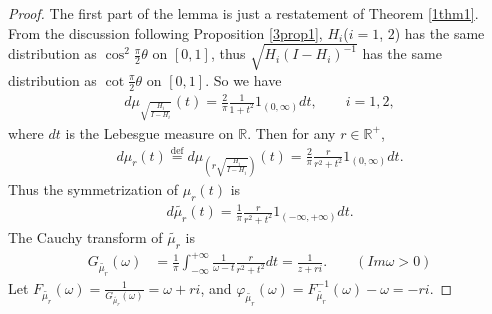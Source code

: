 \documentclass{amsart}
\newcommand{\R}{\mathbb R}  %
\begin{document}
\begin{proof}
The first part of the lemma is just a restatement of Theorem \ref{1thm1}. From the discussion following Proposition \ref{3prop1},
$H_i$($i = 1$, $2$) has the same distribution as $\cos^2\frac{\pi}{2}\theta$ on $[0, 1]$, thus $\sqrt{H_i(I - H_i)^{-1}}$ has
the same distribution as $\cot\frac{\pi}{2}\theta$ on $[0, 1]$. So we have 
\begin{align*}
d\mu_{\sqrt{\frac{H_i}{I - H_i}}}(t) = \frac{2}{\pi}\frac{1}{1+t^2} 1_{(0, \infty)} dt, \qquad i = 1, 2, 
\end{align*}
where $dt$ is the Lebesgue measure on $\R$. Then for any $r \in \R^{+}$,
\begin{align*}
d\mu_r(t)  \overset{\text{def}}{=} d\mu_{(r\sqrt{\frac{H_i}{I - H_i}})}(t) = \frac{2}{\pi}\frac{r}{r^2+t^2} 1_{(0, \infty)} dt.
\end{align*}
Thus the symmetrization of $\mu_r(t)$ is 
\begin{align*}
d\widetilde{\mu_r}(t) = \frac{1}{\pi}\frac{r}{r^2+t^2} 1_{(-\infty, +\infty)} dt.
\end{align*}
The Cauchy transform of $\widetilde{\mu_r}$ is 
\begin{align*}
G_{\widetilde{\mu_r}}(\omega) &= \frac{1}{\pi}\int^{+\infty}_{-\infty} \frac{1}{\omega -t}\frac{r}{r^2+t^2}dt = \frac{1}{z+ri}.   \qquad (Im\omega > 0) 
\end{align*}
Let $F_{\widetilde{\mu_r}}(\omega) = \frac{1}{G_{\widetilde{\mu_r}}(\omega)} = \omega +ri$, and $\varphi_{\widetilde{\mu_r}}(\omega) =
F^{-1}_{\widetilde{\mu_r}}(\omega) -\omega = -ri$.


\end{proof}
\end{document}
